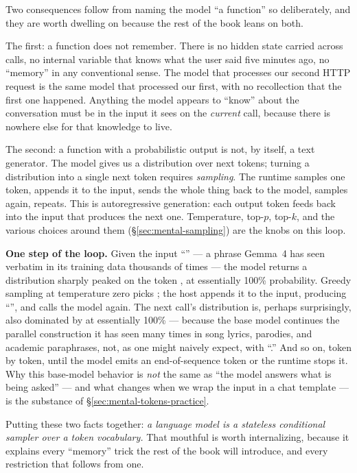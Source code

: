 \noindent
Two consequences follow from naming the model ``a function'' so
deliberately, and they are worth dwelling on because the rest of
the book leans on both.

The first: a function does not remember. There is no hidden state
carried across calls, no internal variable that knows what the
user said five minutes ago, no ``memory'' in any conventional
sense. The model that processes our second HTTP request is the
same model that processed our first, with no recollection that the
first one happened. Anything the model appears to ``know'' about
the conversation must be in the input it sees on the
\emph{current} call, because there is nowhere else for that
knowledge to live.

The second: a function with a probabilistic output is not, by
itself, a text generator. The model gives us a distribution over
next tokens; turning a distribution into a single next token
requires \emph{sampling}. The runtime samples one token, appends
it to the input, sends the whole thing back to the model, samples
again, repeats. This is autoregressive generation: each output
token feeds back into the input that produces the next one.
Temperature, top-$p$, top-$k$, and the various choices around
them (\S\ref{sec:mental-sampling}) are the knobs on this loop.

\begin{examplebox}
\small
\textbf{One step of the loop.} Given the input
``'' --- a phrase Gemma~4 has seen
verbatim in its training data thousands of times --- the model
returns a distribution sharply peaked on the token ,
at essentially 100\% probability. Greedy sampling at
temperature zero picks ; the host appends it to the
input, producing ``'', and calls the
model again. The next call's distribution is, perhaps
surprisingly, also dominated by  at essentially
100\% --- because the base model continues the parallel
construction it has seen many times in song lyrics, parodies,
and academic paraphrases, not, as one might naively expect,
with ``.'' And so on, token by
token, until the model emits an end-of-sequence token or the
runtime stops it. Why this base-model behavior is \emph{not}
the same as ``the model answers what is being asked'' --- and
what changes when we wrap the input in a chat template --- is
the substance of \S\ref{sec:mental-tokens-practice}.
\end{examplebox}

\noindent
Putting these two facts together: \emph{a language model is a
stateless conditional sampler over a token vocabulary.} That
mouthful is worth internalizing, because it explains every
``memory'' trick the rest of the book will introduce, and every
restriction that follows from one.

